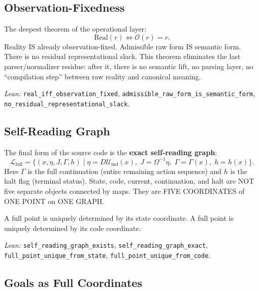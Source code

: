 \subsection{Observation-Fixedness}
\label{sec:manifestability:fixedness}

The deepest theorem of the operational layer:
\begin{equation}
\label{eq:fixedness}
\boxed{
\mathrm{Real}(r) \iff \mathcal{O}(r) = r.
}
\end{equation}
Reality IS already observation-fixed.  Admissible raw form IS semantic form.
There is no residual representational slack.  This theorem eliminates the last
parser/normalizer residue: after it, there is no semantic lift, no parsing layer,
no ``compilation step'' between raw reality and canonical meaning.

\emph{Lean:} \texttt{real\_iff\_observation\_fixed}, \texttt{admissible\_raw\_form\_is\_semantic\_form}, \texttt{no\_residual\_representational\_slack}.

\subsection{Self-Reading Graph}
\label{sec:manifestability:graph}

The final form of the source code is the \textbf{exact self-reading graph}:
\begin{equation}
\label{eq:graph}
\boxed{
\mathcal{L}_{\mathrm{full}}
=
\{(x, \eta, J, \Gamma, h) \mid
\eta = D\mathcal{U}_{\mathrm{ind}}(x),\;
J = \Omega^{-1}\eta,\;
\Gamma = \Gamma(x),\;
h = h(x)
\}.
}
\end{equation}
Here $\Gamma$ is the full continuation (entire remaining action sequence)
and $h$ is the halt flag (terminal status).
State, code, current, continuation, and halt are NOT five separate objects
connected by maps.  They are FIVE COORDINATES of ONE POINT on ONE GRAPH.

A full point is uniquely determined by its state coordinate.
A full point is uniquely determined by its code coordinate.

\emph{Lean:} \texttt{self\_reading\_graph\_exists}, \texttt{self\_reading\_graph\_exact}, \texttt{full\_point\_unique\_from\_state}, \texttt{full\_point\_unique\_from\_code}.

\subsection{Goals as Full Coordinates}
\label{sec:manifestability:goals}

